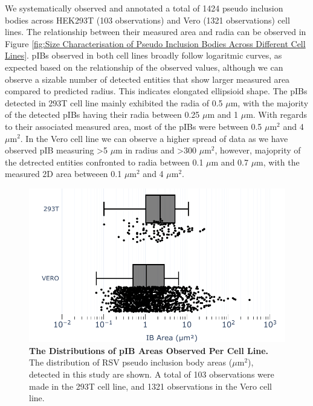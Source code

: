 We systematically observed and annotated a total of 1424 pseudo inclusion bodies across HEK293T (103 observations) and Vero (1321 observations) cell lines. The relationship between their measured area and radia can be observed in Figure \ref{fig:Size Characterisation of Pseudo Inclusion Bodies Across Different Cell Lines}. pIBs observed in both cell lines broadly follow logaritmic curves, as expected based on the relationship of the observed values, although we can observe a sizable number of detected entities that show larger measured area compared to predicted radius. This indicates elongated ellipsioid shape. The pIBs detected in 293T cell line mainly exhibited the radia of 0.5 \(\mu \mbox{m}\), with the majority of the detected pIBs having their radia between 0.25 \(\mu \mbox{m}\) and 1 \(\mu \mbox{m}\). With regards to their associated measured area, most of the pIBs were between 0.5 \(\mu \mbox{m}^2\) and 4 \(\mu \mbox{m}^2\). In the Vero cell line we can observe a higher spread of data as we have observed pIB measuring >5 \(\mu \mbox{m}\) in radius and >300 \(\mu \mbox{m}^2\), however, majoprity of the detrected entities confronted to radia between 0.1 \(\mu \mbox{m}\) and 0.7 \(\mu \mbox{m}\), with the measured 2D area betweeen 0.1 \(\mu \mbox{m}^2\) and 4 \(\mu \mbox{m}^2\).

\begin{figure}
    \centering
    \includegraphics[width=0.75\linewidth]{09. Chapter 4/Figs/01. pIB/01. pIB characterisation/03. box-pib.pdf}
    \caption[The Distributions of pIB Areas Observed Per Cell Line.]{\textbf{The Distributions of pIB Areas Observed Per Cell Line.} The distribution of RSV pseudo inclusion body areas (\(\mu \mbox{m}^2\)), detected in this study are shown. A total of 103 observations were made in the 293T cell line, and 1321 observations in the Vero cell line.}
    \label{fig:The Distributions of pIB Areas Observed Per Cell Line}
\end{figure}

